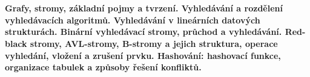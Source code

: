 \documentclass[10pt,a4paper]{article}
\begin{document}
\newpage

\section{}
\paragraph{Grafy, stromy, základní pojmy a tvrzení. Vyhledávání a rozdělení vyhledávacích algoritmů. Vyhledávání v lineárních datových strukturách. Binární vyhledávací stromy, průchod a vyhledávání. Red-black stromy, AVL-stromy, B-stromy a jejich struktura, operace vyhledání, vložení a zrušení prvku. Hashování: hashovací funkce, organizace tabulek a způsoby řešení konfliktů.}
\end{document}
